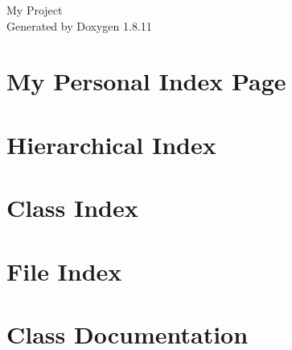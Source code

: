 \documentclass[twoside]{book}
\newcommand{\+}{\discretionary{\mbox{\scriptsize$\hookleftarrow$}}{}{}}
\newcommand{\clearemptydoublepage}{%
  \newpage{\pagestyle{empty}\cleardoublepage}%
}
\begin{document}
\hypersetup{pageanchor=false,
             bookmarksnumbered=true,
             pdfencoding=unicode
            }
\begin{titlepage}
\vspace*{7cm}
\begin{center}%
{\Large My Project }\\
\vspace*{1cm}
{\large Generated by Doxygen 1.8.11}\\
\end{center}
\end{titlepage}
\clearemptydoublepage
\tableofcontents
\clearemptydoublepage
{}
\hypersetup{pageanchor=true}

\chapter{My Personal Index Page}
\label{index}\hypertarget{index}{}
\chapter{Hierarchical Index}

\chapter{Class Index}

\chapter{File Index}

\chapter{Class Documentation}


























\end{document}

